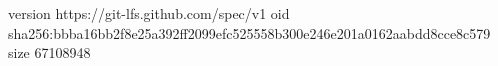 version https://git-lfs.github.com/spec/v1
oid sha256:bbba16bb2f8e25a392ff2099efc525558b300e246e201a0162aabdd8cce8c579
size 67108948

